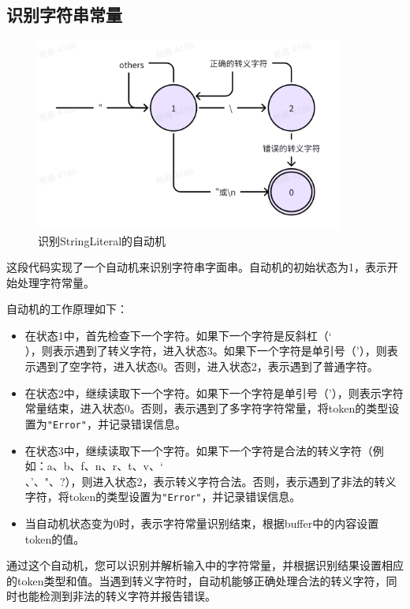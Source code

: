 \documentclass[lang=cn,11pt,a4paper]{elegantpaper}
\begin{document}
\subsection{识别字符串常量}

\begin{figure}[!htb]
    \centering
    \includegraphics[width=0.9\textwidth]{image/String.png}
    \caption{识别StringLiteral的自动机}
\end{figure}

这段代码实现了一个自动机来识别字符串字面串。自动机的初始状态为1，表示开始处理字符常量。

自动机的工作原理如下：
\begin{itemize}
    \item 在状态1中，首先检查下一个字符。如果下一个字符是反斜杠（\char`\\），则表示遇到了转义字符，进入状态3。如果下一个字符是单引号（'），则表示遇到了空字符，进入状态0。否则，进入状态2，表示遇到了普通字符。
    \item 在状态2中，继续读取下一个字符。如果下一个字符是单引号（'），则表示字符常量结束，进入状态0。否则，表示遇到了多字符字符常量，将token的类型设置为\lstinline{"Error"}，并记录错误信息。
    \item 在状态3中，继续读取下一个字符。如果下一个字符是合法的转义字符（例如：a、b、f、n、r、t、v、\char`\\、'、"、?），则进入状态2，表示转义字符合法。否则，表示遇到了非法的转义字符，将token的类型设置为\lstinline{"Error"}，并记录错误信息。
    \item 当自动机状态变为0时，表示字符常量识别结束，根据buffer中的内容设置token的值。
\end{itemize}

通过这个自动机，您可以识别并解析输入中的字符常量，并根据识别结果设置相应的token类型和值。当遇到转义字符时，自动机能够正确处理合法的转义字符，同时也能检测到非法的转义字符并报告错误。
\end{document}

